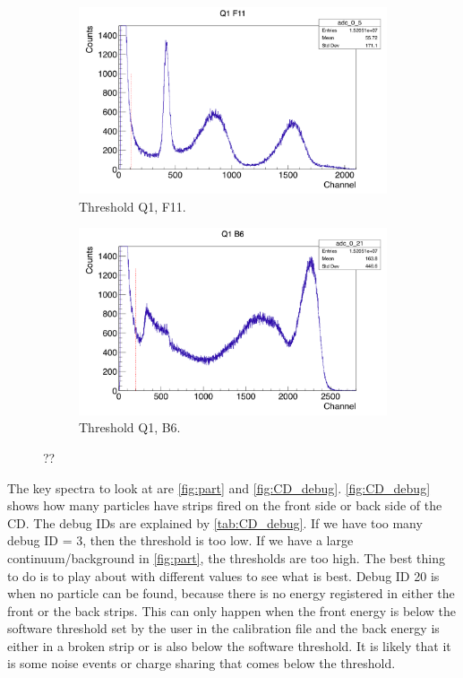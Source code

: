 \documentclass[twoside,english]{uiofysmaster/uiofysmaster}
\begin{document}
\begin{figure}
	\centering
	\begin{subfigure}{\textwidth}
		\centering
		\includegraphics[width=\textwidth]{../Plots/plotting/Threshold_Q1_f11.png}
		\caption{Threshold Q1, F11.}
		\label{fig:Threshold_f}
	\end{subfigure}
	\begin{subfigure}{\textwidth}
		\centering
		\includegraphics[width=\textwidth]{../Plots/plotting/Threshold_Q1_b6.png}
		\caption{Threshold Q1, B6.}
		\label{fig:Threshold_b}
	\end{subfigure}
	\caption{??}
	\label{fig:Threshold}
\end{figure}


The key spectra to look at are \autoref{fig:part} and \autoref{fig:CD_debug}. 
\autoref{fig:CD_debug} shows how many particles have strips fired on the front side or back side of the CD. 
The debug IDs are explained by \autoref{tab:CD_debug}. 
If we have too many debug ID = 3, then the threshold is too low. If we have a large continuum/background in \autoref{fig:part}, the thresholds are too high. The best thing to do is to play about with different values to see what is best.
Debug ID 20 is when no particle can be found, because there is no energy registered in either the front or the back strips. 
This can only happen when the front energy is below the software threshold set by the user in the calibration file and the back energy is either in a broken strip or is also below the software threshold. 
It is likely that it is some noise events or charge sharing that comes below the threshold. 
\end{document}
